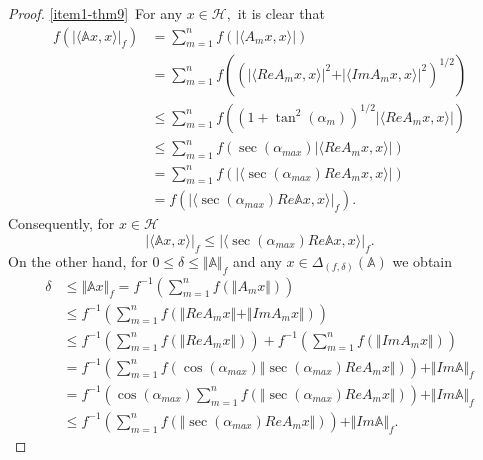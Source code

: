 \documentclass[12pt]{article}
\begin{document}
\begin{proof}
 \noindent \ref{item1-thm9}\ For any $ x\in \mathcal{H},
 $ it is clear that
\begin{align*}
f\left(  \vert \langle \mathbb{A}x,x \rangle \vert_{f}\right) &= \sum\limits_{m=1}^{n} f\left(  \vert \langle A_{m}x,x \rangle \vert\right) \\
&= \sum\limits_{m=1}^{n} f\left( \left( \vert \langle ReA_{m}x,x\rangle \vert^{2} + \vert \langle ImA_{m}x,x\rangle \vert^{2}\right) ^{1/2} \right) \\
&\leq \sum\limits_{m=1}^{n} f \left( \left( 1+\tan^{2}(\alpha_{m}) \right)^{1/2} \vert \langle ReA_{m}x,x\rangle \vert \right) \\
&\leq \sum\limits_{m=1}^{n} f \left( \sec(\alpha_{max})\vert \langle ReA_{m}x,x\rangle \vert \right) \\
&= \sum\limits_{m=1}^{n} f \left( \vert \langle \sec(\alpha_{max})ReA_{m}x,x\rangle \vert \right) \\
&= f \left( \vert \langle \sec(\alpha_{max})Re\mathbb{A}x,x\rangle \vert_{f}\right).
\end{align*}
Consequently, for $ x\in \mathcal{H}$
\begin{equation}
\label{equ20}
\vert \langle \mathbb{A} x,x \rangle \vert_{f}\leq \vert \langle \sec(\alpha_{max})Re\mathbb{A}x,x\rangle \vert_{f}.
\end{equation}
On the other hand, for $ 0\leq\delta\leq \Vert  \mathbb{A} \Vert_{f} $ and any $ x\in \Delta_{(f,\delta)}( \mathbb{A}) $ we obtain
\begin{align*}
\delta &\leq \Vert \mathbb{A} x \Vert_{f} = f^{-1}\left( \sum\limits_{m=1}^{n}f\left( \Vert A_{m}x \Vert \right)  \right) \\
&\leq f^{-1} \left( \sum\limits_{m=1}^{n}f\left( \Vert ReA_{m}x \Vert + \Vert Im A_{m}x \Vert \right)  \right) \\
&\leq f^{-1} \left( \sum\limits_{m=1}^{n}f\left( \Vert ReA_{m}x \Vert \right)  \right)+f^{-1} \left( \sum\limits_{m=1}^{n}f\left( \Vert Im A_{m}x \Vert \right)  \right) \\
&= f^{-1} \left( \sum\limits_{m=1}^{n}f\left( \cos(\alpha_{max})\Vert \sec(\alpha_{max})ReA_{m}x \Vert \right)  \right)+ \Vert Im \mathbb{A} \Vert_{f}\\
&= f^{-1}\left( \cos(\alpha_{max})\sum\limits_{m=1}^{n}f\left( \Vert \sec(\alpha_{max})ReA_{m}x \Vert \right)  \right) + \Vert Im \mathbb{A} \Vert_{f} \\
&\leq f^{-1}\left(\sum\limits_{m=1}^{n}f\left( \Vert \sec(\alpha_{max})ReA_{m}x \Vert \right)  \right) + \Vert Im \mathbb{A} \Vert_{f}.

\end{align*}
\end{proof}
\end{document}
